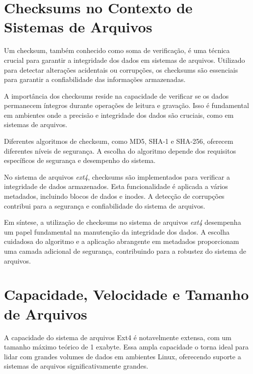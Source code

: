 \documentclass[
	12pt,				%
	openright,			%
	oneside,			%
	a4paper,			%
	chapter=TITLE,		%
	english,			%
	french,				%
	spanish,			%
	brazil				%
	]{abntex2}
\theoremstyle{definition}
\begin{document}

\section{Checksums no Contexto de Sistemas de Arquivos}

Um checksum, também conhecido como soma de verificação, é uma técnica crucial para garantir a integridade dos dados em sistemas de arquivos. Utilizado para detectar alterações acidentais ou corrupções, os checksums são essenciais para garantir a confiabilidade das informações armazenadas.

A importância dos checksums reside na capacidade de verificar se os dados permanecem íntegros durante operações de leitura e gravação. Isso é fundamental em ambientes onde a precisão e integridade dos dados são cruciais, como em sistemas de arquivos.

Diferentes algoritmos de checksum, como MD5, SHA-1 e SHA-256, oferecem diferentes níveis de segurança. A escolha do algoritmo depende dos requisitos específicos de segurança e desempenho do sistema.

No sistema de arquivos \textit{ext4}, checksums são implementados para verificar a integridade de dados armazenados. Esta funcionalidade é aplicada a vários metadados, incluindo blocos de dados e inodes. A detecção de corrupções contribui para a segurança e confiabilidade do sistema de arquivos.

Em síntese, a utilização de checksums no sistema de arquivos \textit{ext4} desempenha um papel fundamental na manutenção da integridade dos dados. A escolha cuidadosa do algoritmo e a aplicação abrangente em metadados proporcionam uma camada adicional de segurança, contribuindo para a robustez do sistema de arquivos.



\section{Capacidade, Velocidade e Tamanho de Arquivos}
A capacidade do sistema de arquivos Ext4 é notavelmente extensa, com um tamanho máximo teórico de 1 exabyte. Essa 
ampla capacidade o torna ideal para lidar com grandes volumes de dados em ambientes Linux, oferecendo suporte a 
sistemas de arquivos significativamente grandes.
\end{document}
